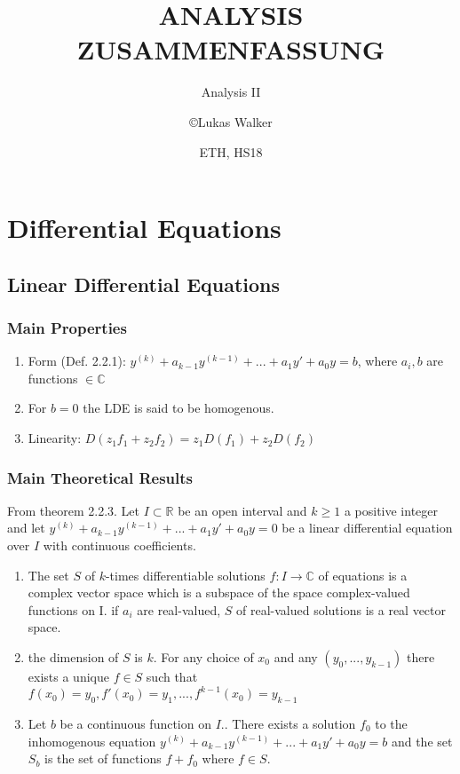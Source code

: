 \documentclass[9pt]{scrartcl}
\title{ANALYSIS ZUSAMMENFASSUNG}
\subtitle{Analysis II}
\author{\copyright Lukas Walker}
\date{ETH, HS18}
\newcommand\R{\mathbb{R}}
\newcommand\C{\mathbb{C}}
\let\stdsection\section
\renewcommand\section{\stdsection}%
\begin{document}
\maketitle
\begin{multicols}{2}
	\tableofcontents
\end{multicols}
	
\twocolumn
\columnseprule 1pt
    
\section{Differential Equations}

\subsection{Linear Differential Equations}
			
    \subsubsection{Main Properties}
    
    \begin{enumerate}
        \item Form (Def. 2.2.1): $y^{(k)} + a_{k-1}y^{(k-1)} + ... + a_{1}y' + a_0y = b$, where $a_i, b$ are functions $\in \C$
        \item For $b=0$ the LDE is said to be homogenous.
        \item Linearity: $D(z_1f_1 + z_2f_2) = z_1D(f_1) + z_2D(f_2)$
    \end{enumerate}
    
    \subsubsection{Main Theoretical Results}
    
    From theorem 2.2.3.
    Let $I\subset \R$ be an open interval and $k \geq 1$ a positive integer and let $y^{(k)} + a_{k-1}y^{(k-1)} + ... + a_1y' + a_0y = 0$ be a linear differential equation over $I$ with continuous coefficients.
    
    \begin{enumerate}
        \item The set $S$ of $k$-times differentiable solutions $f:I \to\C$ of equations is a complex vector space which is a subspace of the space complex-valued functions on I.
        \subitem if $a_i$ are real-valued, $S$ of real-valued solutions is a real vector space.
        \item the dimension of $S$ is $k$. For any choice of $x_0$ and any $(y_0,...,y_{k-1})$ there exists a unique $f\in S$ such that $f(x_0) = y_0, f'(x_0) = y_1, ..., f^{k-1}(x_0) = y_{k-1}$
        \item Let $b$ be a continuous function on $I$.. There exists a solution $f_0$ to the inhomogenous equation $y^(k) + a_{k-1}y^{(k-1)} + ... + a_1y' + a_0y = b$ and the set $S_b$ is the set of functions $f + f_0$ where $f \in S$.
    \end{enumerate}
    
    
\end{document}
